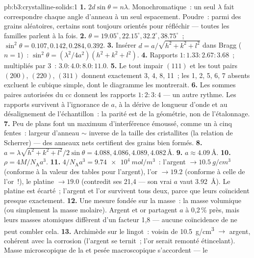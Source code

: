 \begin{solution}{pb:b3:crystalline-solids:1}
\textbf{1.} $2d\sin\theta = n\lambda$. Monochromatique~: un seul
$\lambda$ fait correspondre chaque angle d'anneau à un seul
espacement. Poudre~: parmi des grains aléatoires, certains sont
toujours orientés pour réfléchir --- toutes les familles parlent à
la fois.
\textbf{2.} $\theta = 19.05^\circ, 22.15^\circ, 32.2^\circ,
38.75^\circ$~; $\sin^2\theta = 0.107, 0.142, 0.284, 0.392$.
\textbf{3.} Insérer $d = a/\sqrt{h^2+k^2+l^2}$ dans Bragg
($n = 1$)~: $\sin^2\theta = (\lambda^2/4a^2)(h^2+k^2+l^2)$.
\textbf{4.} Rapports $1 : 1.33 : 2.67 : 3.68$~; multipliés par 3~:
$3.0 : 4.0 : 8.0 : 11.0$.
\textbf{5.} Le tout impair $(111)$ et les tout pairs $(200)$,
$(220)$, $(311)$ donnent exactement 3, 4, 8, 11~; les 1, 2, 5, 6, 7
absents excluent le cubique simple, dont le diagramme les
montrerait.
\textbf{6.} Les sommes paires autorisées du cc donnent les rapports
$1:2:3:4$ --- un autre rythme. Les rapports survivent à
l'ignorance de $a$, à la dérive de longueur d'onde et au
désalignement de l'échantillon~: la parité est de la géométrie, non
de l'étalonnage.
\textbf{7.} Peu de plans font un maximum d'interférence émoussé,
comme un  à cinq fentes~: largeur d'anneau $\sim$ inverse de
la taille des cristallites (la relation de Scherrer) --- des anneaux
nets certifient des grains bien formés.
\textbf{8.} $a = \lambda\sqrt{h^2+k^2+l^2}/2\sin\theta = 4.088,
4.086, 4.089, 4.082\,\unit{\angstrom}$.
\textbf{9.} $a \approx \qty{4.09}{\angstrom}$.
\textbf{10.} $\rho = 4M/N_{\text{A}}a^3$.
\textbf{11.} $4/N_{\text{A}}a^3 = \qty{9.74e4}{mol/m^3}$~:
l'argent $\to \qty{10.5}{g/cm^3}$ (conforme à la valeur des tables
pour l'argent), l'or $\to 19.2$ (conforme à celle de l'or~!), le
platine $\to 19.0$ (contredit ses 21,4 --- son vrai $a$ vaut
\qty{3.92}{\angstrom}). Le platine est écarté~; l'argent et l'or
survivent tous deux, parce que leurs  coïncident
presque exactement.
\textbf{12.} Une mesure fondée sur la masse~: la masse volumique
(ou simplement la masse molaire). Argent et or partagent $a$ à
0,2\,\% près, mais leurs masses atomiques diffèrent d'un facteur 1,8
--- aucune coïncidence de  ne peut combler cela.
\textbf{13.} Archimède sur le lingot~: voisin de
\qty{10.5}{g/cm^3} $\to$ argent, cohérent avec la corrosion
(l'argent se ternit~; l'or serait remonté étincelant). Masse
microscopique de la  et pesée macroscopique s'accordent --- le

\end{solution}
